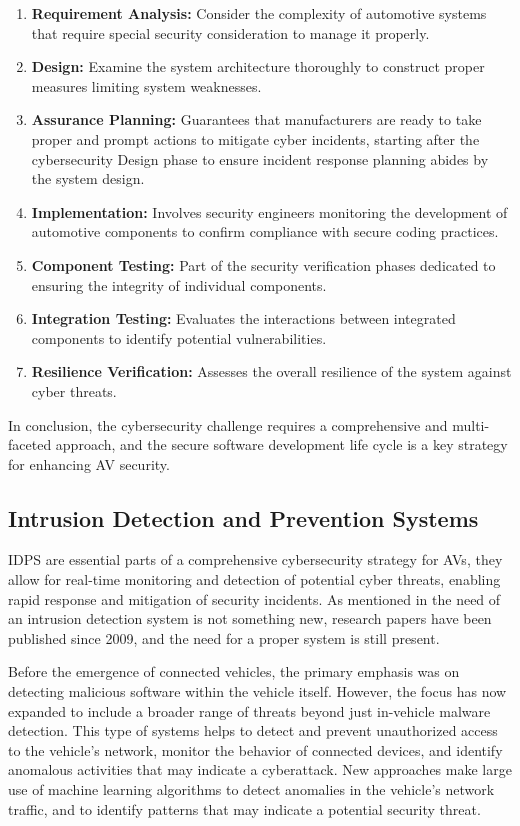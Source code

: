 \begin{enumerate}
    \item \textbf{Requirement Analysis:} Consider the complexity of automotive systems that require special security consideration to manage it properly.
    \item \textbf{Design:} Examine the system architecture thoroughly to construct proper measures limiting system weaknesses.
    \item \textbf{Assurance Planning:} Guarantees that manufacturers are ready to take proper and prompt actions to mitigate cyber incidents, starting after the cybersecurity Design phase to ensure incident response planning abides by the system design.
    \item \textbf{Implementation:} Involves security engineers monitoring the development of automotive components to confirm compliance with secure coding practices.
    \item \textbf{Component Testing:} Part of the security verification phases dedicated to ensuring the integrity of individual components.
    \item \textbf{Integration Testing:} Evaluates the interactions between integrated components to identify potential vulnerabilities.
    \item \textbf{Resilience Verification:} Assesses the overall resilience of the system against cyber threats.
\end{enumerate}

In conclusion, the cybersecurity challenge requires a comprehensive and multi-faceted approach, and the secure software development life cycle is a key strategy for enhancing AV security.

\subsection{Intrusion Detection and Prevention Systems}\label{subsec:intrusion-detection-and-prevention-systems}
IDPS are essential parts of a comprehensive cybersecurity strategy for AVs, they allow for real-time monitoring and detection of potential cyber threats, enabling rapid response and mitigation of security incidents.
As mentioned in\cite{kim2020cybersecurity} the need of an intrusion detection system is not something new, research papers have been published since 2009, and the need for a proper system is still present.

Before the emergence of connected vehicles, the primary emphasis was on detecting malicious software within the vehicle itself.
However, the focus has now expanded to include a broader range of threats beyond just in-vehicle malware detection.
This type of systems helps to detect and prevent unauthorized access to the vehicle's network, monitor the behavior of connected devices, and identify anomalous activities that may indicate a cyberattack.
New approaches make large use of machine learning algorithms to detect anomalies in the vehicle's network traffic, and to identify patterns that may indicate a potential security threat\cite{nagarajan2023machine}.

